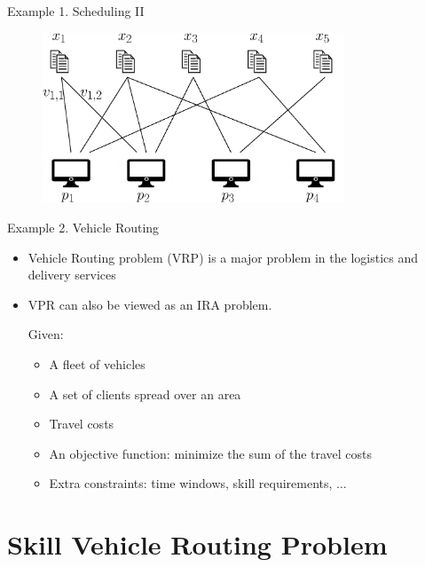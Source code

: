\documentclass[10pt]{beamer}
\begin{document}
\begin{frame}{Example 1. Scheduling II}
\begin{figure}
    \begin{center}
        \includegraphics[width=9cm]{Scheduling.eps}
    \end{center}
\end{figure}
\end{frame}


\begin{frame}{Example 2. Vehicle Routing}
\begin{itemize}
    \item<1-> Vehicle Routing problem (VRP) is a major problem in the logistics and delivery services
    \item<2-> VPR can also be viewed as an IRA problem.
    \begin{example}
        Given: 
        \begin{itemize}
            \item<3-> A fleet of vehicles
            \item<4-> A set of clients spread over an area 
            \item<5-> Travel costs
            \item<6-> An objective function: minimize the sum of the travel costs
            \item<7-> Extra constraints: time windows, skill requirements, $\ldots$
        \end{itemize}        
    \end{example}
\end{itemize}
    
\end{frame}

\section{Skill Vehicle Routing Problem}
\end{document}
